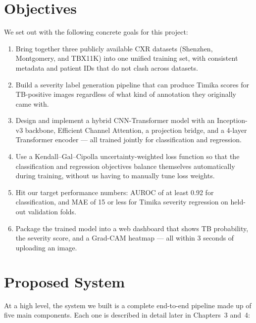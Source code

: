 \documentclass[12pt]{report}
\begin{document}
\section{Objectives}

We set out with the following concrete goals for this project:
\begin{enumerate}
    \item Bring together three publicly available CXR datasets (Shenzhen, Montgomery, and TBX11K) into one unified training set, with consistent metadata and patient IDs that do not clash across datasets.

    \item Build a severity label generation pipeline that can produce Timika scores for TB-positive images regardless of what kind of annotation they originally came with.

    \item Design and implement a hybrid CNN-Transformer model with an Inception-v3 backbone, Efficient Channel Attention, a projection bridge, and a 4-layer Transformer encoder --- all trained jointly for classification and regression.

    \item Use a Kendall--Gal--Cipolla uncertainty-weighted loss function so that the classification and regression objectives balance themselves automatically during training, without us having to manually tune loss weights.

    \item Hit our target performance numbers: AUROC of at least 0.92 for classification, and MAE of 15 or less for Timika severity regression on held-out validation folds.

    \item Package the trained model into a web dashboard that shows TB probability, the severity score, and a Grad-CAM heatmap --- all within 3 seconds of uploading an image.
\end{enumerate}

\section{Proposed System}

At a high level, the system we built is a complete end-to-end pipeline made up of five main components. Each one is described in detail later in Chapters~3 and~4:
\end{document}
